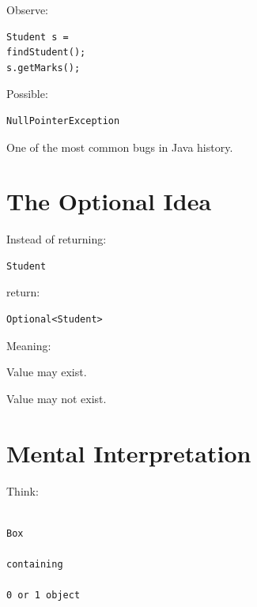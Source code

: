 \documentclass[11pt,a4paper]{book}
\begin{document}
Observe:

\begin{verbatim} 
Student s =
findStudent();
s.getMarks();
\end{verbatim}


Possible:

\begin{verbatim} 
NullPointerException
\end{verbatim}


One of the most common bugs
in Java history.


\section{The Optional Idea}

Instead of returning:

\begin{verbatim} 
Student
\end{verbatim}

return:

\begin{verbatim} 
Optional<Student>
\end{verbatim}


Meaning:


Value may exist.


Value may not exist.


\section{Mental Interpretation}

Think:

\begin{verbatim}

Box

containing

0 or 1 object

\end{verbatim}
\end{document}
